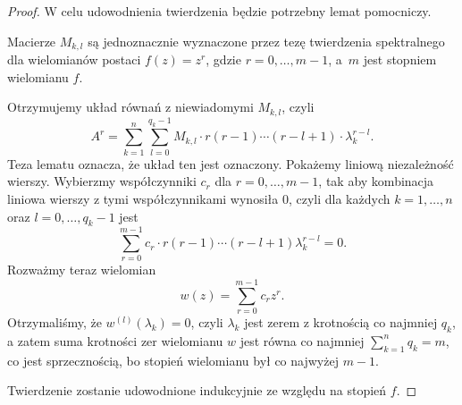 \begin{proof}
  W celu udowodnienia twierdzenia będzie potrzebny lemat pomocniczy.
%
  \begin{nestedlemma} \label{L: 1.4.2}
    Macierze $M_{k,l}$ są jednoznacznie wyznaczone przez tezę twierdzenia spektralnego dla
    wielomianów postaci $f(z) = z^r$, gdzie $r = 0, \ldots, m-1$, a~$m$ jest stopniem wielomianu $f$.
  \end{nestedlemma}
%
  \begin{nestedproof}
    Otrzymujemy układ równań z niewiadomymi $M_{k,l}$, czyli
%   
    \begin{equation*}
      A^r = \sum_{k=1}^n \sum_{l=0}^{q_k-1} M_{k,l} \cdot r (r-1) \cdots (r-l+1) \cdot \lambda_k^{r-l}.
    \end{equation*}
%   
    Teza lematu oznacza, że układ ten jest oznaczony. Pokażemy liniową niezależność wierszy. Wybierzmy współczynniki 
    $c_r$ dla $r = 0, \ldots, m-1$, tak aby kombinacja liniowa wierszy z tymi współczynnikami wynosiła $0$, czyli dla
    każdych $k = 1,\ldots,n$ oraz $l = 0, \ldots, q_k-1$ jest
%   
    \begin{equation*}
      \sum_{r=0}^{m-1} c_r \cdot r (r-1) \cdots (r-l+1) \lambda_k^{r-l} = 0.
    \end{equation*}
%
    Rozważmy teraz wielomian
%    
    \begin{equation*}
      w(z) = \sum_{r=0}^{m-1} c_r z^r.
    \end{equation*}
%
    Otrzymaliśmy, że $w^{(l)}(\lambda_k) = 0$, czyli 
    $\lambda_k$ jest zerem z krotnością co najmniej $q_k$, a zatem suma krotności zer wielomianu $w$ jest równa co 
    najmniej $\sum_{k=1}^n q_k = m$, co jest sprzecznością, bo stopień wielomianu był co najwyżej $m-1$.
  \end{nestedproof}
%
  Twierdzenie zostanie udowodnione indukcyjnie ze względu na stopień $f$.
  

\end{proof}
